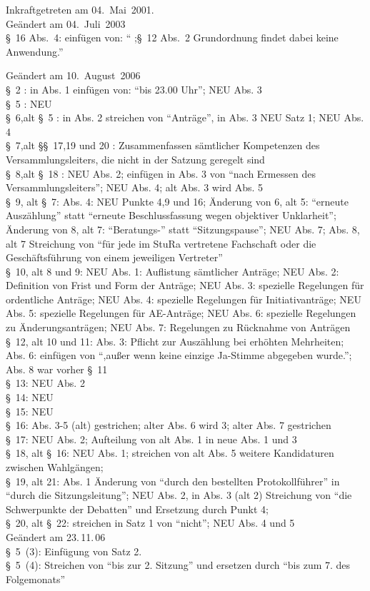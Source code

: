 \nopagebreak
\vspace{1cm}
Inkraftgetreten am 04.~Mai~2001.
\\


\footnotesize
Geändert am 04.~Juli~2003\\
§~16 Abs.~4: einfügen von: "` ;§~12 Abs.~2 Grundordnung findet dabei keine Anwendung."'

Geändert am 10.~August~2006\\
§~2 : in Abs. 1 einfügen von: "`bis 23.00 Uhr"'; NEU Abs. 3\\
§~5 : NEU\\
§~6,alt §~5 : in Abs. 2 streichen von "`Anträge"', in Abs. 3 NEU Satz 1; NEU Abs. 4\\
§~7,alt §§~17,19 und 20 : Zusammenfassen sämtlicher Kompetenzen des Versammlungsleiters, die nicht in der Satzung geregelt sind \\
§~8,alt §~18 : NEU Abs. 2; einfügen in Abs. 3 von "`nach Ermessen des Versammlungsleiters"'; NEU Abs. 4; alt Abs. 3 wird Abs. 5\\
§~9, alt §~7: Abs. 4: NEU Punkte 4,9 und 16; Änderung von 6, alt 5: "`erneute Auszählung"' statt "`erneute Beschlussfassung wegen objektiver Unklarheit"'; Änderung von 8, alt 7: "`Beratungs-"' statt "`Sitzungspause"'; NEU Abs. 7; Abs. 8, alt 7 Streichung von "`für jede im StuRa vertretene Fachschaft oder die Geschäftsführung von einem jeweiligen Vertreter"'\\
§~10, alt 8 und 9: NEU Abs. 1: Auflistung sämtlicher Anträge; NEU Abs. 2: Definition von Frist und Form der Anträge; NEU Abs. 3: spezielle Regelungen für ordentliche Anträge; NEU Abs. 4: spezielle Regelungen für Initiativanträge; NEU Abs. 5: spezielle Regelungen für AE-Anträge; NEU Abs. 6: spezielle Regelungen zu Änderungsanträgen; NEU Abs. 7: Regelungen zu Rücknahme von Anträgen\\
§~12, alt 10 und 11: Abs. 3: Pflicht zur Auszählung bei erhöhten Mehrheiten; Abs. 6: einfügen von "`,außer wenn keine einzige Ja-Stimme abgegeben wurde."'; Abs. 8 war vorher §~11\\
§~13: NEU Abs. 2\\
§~14: NEU\\
§~15: NEU\\
§~16: Abs. 3-5 (alt) gestrichen; alter Abs. 6 wird 3; alter Abs. 7 gestrichen\\
§~17: NEU Abs. 2; Aufteilung von alt Abs. 1 in neue Abs. 1 und 3\\
§~18, alt §~16: NEU Abs. 1; streichen von alt Abs. 5 weitere Kandidaturen zwischen Wahlgängen;\\
§~19, alt 21: Abs. 1 Änderung von "`durch den bestellten Protokollführer"' in "`durch die Sitzungsleitung"'; NEU Abs. 2, in Abs. 3 (alt 2) Streichung von "`die Schwerpunkte der Debatten"' und Ersetzung durch Punkt 4;\\
§~20, alt §~22: streichen in Satz 1 von "`nicht"'; NEU Abs. 4 und 5\\
Geändert am 23.\,11.\,06\\
§~5~(3): Einfügung von Satz 2.\\
§~5~(4): Streichen von "`bis zur 2. Sitzung"' und ersetzen durch "`bis zum 7. des Folgemonats"'

